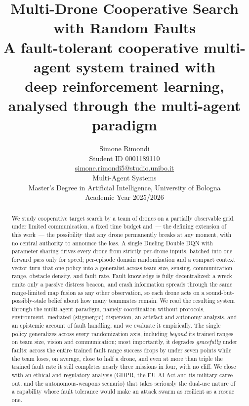 \documentclass[11pt,a4paper]{article}
\title{\textbf{Multi-Drone Cooperative Search\\ with Random Faults}\\[0.4em]
\large A fault-tolerant cooperative multi-agent system trained with\\ deep reinforcement learning, analysed through the multi-agent paradigm}
\author{Simone Rimondi\\[0.3em]
\small Student ID 0001189110\\[0.2em]
\small \href{mailto:simone.rimondi5@studio.unibo.it}{simone.rimondi5@studio.unibo.it}\\[0.3em]
\small Multi-Agent Systems\\
\small Master's Degree in Artificial Intelligence, University of Bologna\\
\small Academic Year 2025/2026}
\date{}
\begin{document}
\maketitle

\begin{abstract}
\noindent
We study cooperative target search by a team of drones on a partially
observable grid, under limited communication, a fixed time budget and~--- the
defining extension of this work~--- the possibility that any drone
permanently breaks at any moment, with no central authority to announce the
loss. A single Dueling Double DQN with parameter sharing drives every drone
from strictly per-drone inputs, batched into one forward pass only for speed;
per-episode domain randomization and a compact
context vector turn that one policy into a generalist across team size,
sensing, communication range, obstacle density, and fault rate. Fault
knowledge is fully decentralized: a wreck emits only a passive distress
beacon, and crash information spreads through the same range-limited map fusion
as any other observation, so each drone acts on a sound-but-possibly-stale
belief about how many teammates remain. We read the resulting system through
the multi-agent paradigm, namely coordination without protocols, environment-%
mediated (stigmergic) dispersion, an artefact and autonomy analysis, and an
epistemic account of fault handling, and we evaluate it empirically. The
single policy generalizes across every randomization axis, including
\emph{beyond} its trained ranges on team size, vision and communication; most
importantly, it degrades \emph{gracefully} under faults: across the
entire trained fault range success drops by under seven points while the team
loses, on average, close to half a drone, and even at more than triple the
trained fault rate it still completes nearly three missions in four, with no
cliff. We
close with an ethical and regulatory analysis (GDPR, the EU AI Act and its
military carve-out, and the autonomous-weapons scenario) that takes seriously
the dual-use nature of a capability whose fault tolerance would make an attack
swarm as resilient as a rescue one.
\end{abstract}
\end{document}

